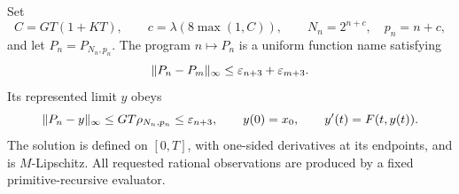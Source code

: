 \begin{theorem}
\label{thm:analytic-ode-existence}
Set
\[
 C=GT(1+KT),\qquad c=\lambda(8\max(1,C)),\qquad
 N_n=2^{n+c},\quad p_n=n+c,
\]
and let $P_n=P_{N_n,p_n}$.  The program $n\mapsto P_n$ is a uniform function name satisfying
\begin{equation}
 \|P_n-P_m\|_\infty\le\varepsilon_{n+3}+\varepsilon_{m+3}.
 \label{eq:analytic-ode-name}
\end{equation}
Its represented limit $y$ obeys
\begin{equation}
 \|P_n-y\|_\infty\le GT\rho_{N_n,p_n}\le\varepsilon_{n+3},\qquad
 y(0)=x_0,\qquad y'(t)=F(t,y(t)).\label{eq:analytic-ode-solution}
\end{equation}
The solution is defined on $[0,T]$, with one-sided derivatives at its endpoints, and is $M$-Lipschitz.  All requested rational observations are produced by a fixed primitive-recursive evaluator.
\end{theorem}

